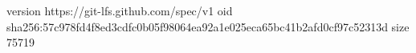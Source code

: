 version https://git-lfs.github.com/spec/v1
oid sha256:57c978fd4f8ed3cdfc0b05f98064ea92a1e025eca65bc41b2afd0cf97c52313d
size 75719
